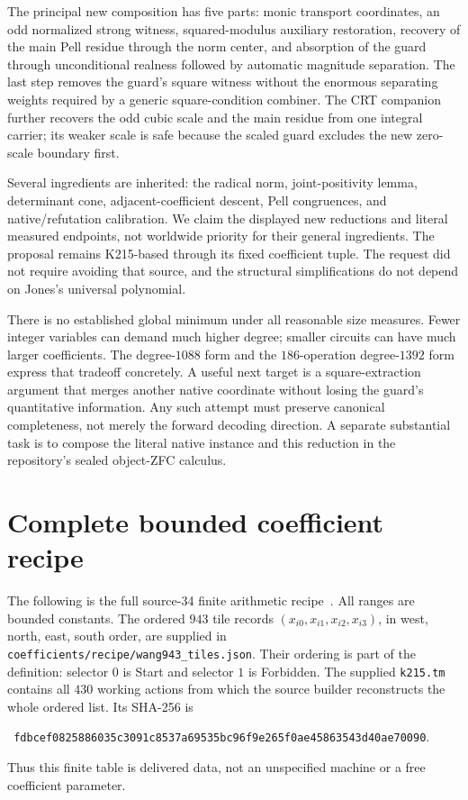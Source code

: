 \documentclass[11pt,a4paper]{article}
\theoremstyle{definition}\newtheorem{definition}[theorem]{Definition}
\theoremstyle{remark}\newtheorem{remark}[theorem]{Remark}
\numberwithin{equation}{section}
\begin{document}
The principal new composition has five parts: monic transport
coordinates, an odd normalized strong witness, squared-modulus
auxiliary restoration, recovery of the main Pell residue through the
norm center, and absorption of the guard through unconditional
realness followed by automatic magnitude separation.
The last step removes the guard's square witness without the enormous
separating weights required by a generic square-condition combiner.
The CRT companion further recovers the odd cubic scale and the main
residue from one integral carrier; its weaker scale is safe because
the scaled guard excludes the new zero-scale boundary first.

Several ingredients are inherited: the radical norm, joint-positivity
lemma, determinant cone, adjacent-coefficient descent, Pell
congruences, and native/refutation calibration. We claim the displayed
new reductions and literal measured endpoints, not worldwide priority
for their general ingredients. The proposal remains K215-based through
its fixed coefficient tuple. The request did not require avoiding
that source, and the structural simplifications do not depend on
Jones's universal polynomial.

There is no established global minimum under all reasonable size
measures. Fewer integer variables can demand much higher degree;
smaller circuits can have much larger coefficients. The degree-\(1088\)
form and the \(186\)-operation degree-\(1392\) form express that
tradeoff concretely. A useful next target is a square-extraction
argument that merges another native coordinate without losing the
guard's quantitative information. Any such attempt must preserve
canonical completeness, not merely the forward decoding direction.
A separate substantial task is to compose the literal native instance
and this reduction in the repository's sealed object-ZFC calculus.

\appendix
\section{Complete bounded coefficient recipe}\label{app:coeff}

The following is the full source-34 finite arithmetic recipe~\cite{coeff}.
All ranges are bounded constants. The ordered \(943\) tile records
\((x_{i0},x_{i1},x_{i2},x_{i3})\), in west, north, east, south order,
are supplied in
\texttt{coefficients/recipe/wang943\_tiles.json}.
Their ordering is part of the definition: selector \(0\) is Start
and selector \(1\) is Forbidden.
The supplied \texttt{k215.tm} contains all \(430\) working actions
from which the source builder reconstructs the whole ordered list.
Its SHA-256 is
\begin{center}\small\texttt{
fdbcef0825886035c3091c8537a69535bc96f9e265f0ae45863543d40ae70090}.
\end{center}
Thus this finite table is delivered data, not an unspecified machine
or a free coefficient parameter.
\end{document}
